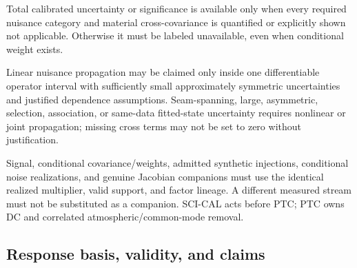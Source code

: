 \begin{description}[style=nextline]
\item[\Req{037}: total-uncertainty claim.]
  Total calibrated uncertainty or significance is available only when every
  required nuisance category and material cross-covariance is quantified or
  explicitly shown not applicable. Otherwise it must be labeled unavailable,
  even when conditional weight exists.

\item[\Req{038}: propagation regime.]
  Linear nuisance propagation may be claimed only inside one differentiable
  operator interval with sufficiently small approximately symmetric
  uncertainties and justified dependence assumptions. Seam-spanning, large,
  asymmetric, selection, association, or same-data fitted-state uncertainty
  requires nonlinear or joint propagation; missing cross terms may not be set
  to zero without justification.

\item[\Req{039}: shared realized operator.]
  Signal, conditional covariance/weights, admitted synthetic injections,
  conditional noise realizations, and genuine Jacobian companions must use
  the identical realized multiplier, valid support, and factor lineage. A
  different measured stream must not be substituted as a companion. SCI-CAL
  acts before PTC; PTC owns DC and correlated atmospheric/common-mode removal.
\end{description}

\subsection{Response basis, validity, and claims}

